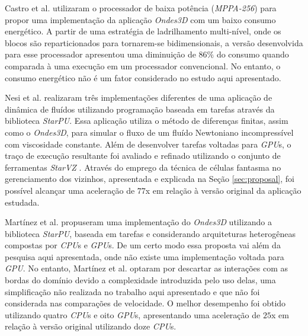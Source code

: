 \documentclass[cic,tc]{iiufrgs}
\begin{document}
Castro et al. \cite{CASTRO2016108} utilizaram o processador de baixa potência (\textit{MPPA-256}) para propor uma implementação da aplicação \textit{Ondes3D} com um baixo consumo energético. A partir
de uma estratégia de ladrilhamento multi-nível, onde os blocos são reparticionados para tornarem-se bidimensionais, a versão desenvolvida para esse processador apresentou uma diminuição de $86\%$ do consumo quando comparada à uma
execução em um processador convencional. No entanto, o consumo energético não é um fator considerado no estudo aqui apresentado.



Nesi et al. \cite{nesi} realizaram três implementações diferentes de uma aplicação de dinâmica de fluídos utilizando programação baseada em tarefas através da biblioteca \textit{StarPU}. Essa aplicação utiliza o método de diferenças finitas, assim como o \textit{Ondes3D}, para simular o fluxo de um fluído Newtoniano incompressível com viscosidade constante. Além de desenvolver tarefas voltadas para \textit{GPU}s, o traço de execução resultante foi avaliado e refinado utilizando o conjunto de ferramentas \textit{StarVZ} \cite{starvz1, starvz2, starvz3}. Através do emprego da técnica de células fantasma no gerenciamento dos vizinhos, apresentada e explicada na Seção \ref{sec:proposal}, foi possível alcançar uma aceleração de $77$x em relação à versão original da aplicação estudada.

Martínez et al. \cite{victor} propuseram uma implementação do \textit{Ondes3D} utilizando a biblioteca \textit{StarPU}, baseada em tarefas e considerando arquiteturas heterogêneas compostas por
\textit{CPU}s e \textit{GPU}s. De um certo modo essa proposta vai além da pesquisa aqui apresentada, onde não existe uma implementação voltada para \textit{GPU}. No entanto, Martínez et al.
optaram por descartar as interações com as bordas do domínio devido a complexidade introduzida pelo uso delas, uma simplificação não realizada no trabalho aqui apresentado e que não foi considerada nas comparações de velocidade. O melhor desempenho foi obtido utilizando quatro \textit{CPU}s e oito
\textit{GPU}s, apresentando uma aceleração de $25$x em relação à versão original utilizando doze \textit{CPU}s.
\end{document}
